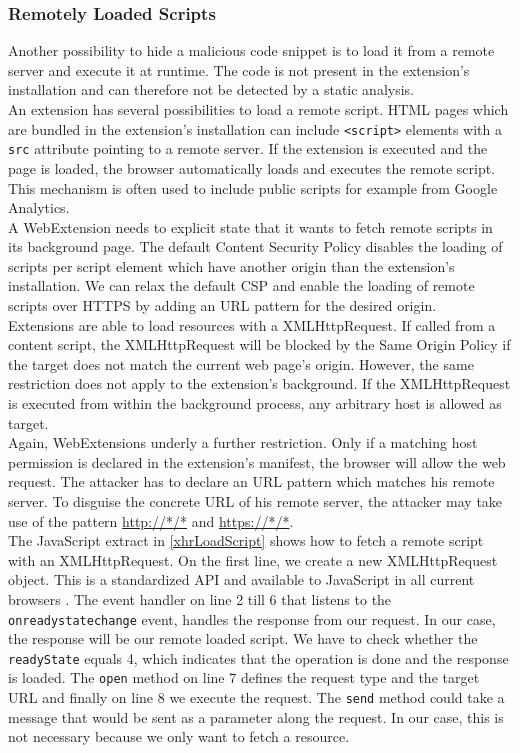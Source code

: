 		\subsubsection{Remotely Loaded Scripts}
			
			Another possibility to hide a malicious code snippet is to load it from a remote server and execute it at runtime. The code is not present in the extension's installation and can therefore not be detected by a static analysis. \\
		
			An extension has several possibilities to load a remote script. HTML pages which are bundled in the extension's installation can include \texttt{<script>} elements with a \texttt{src} attribute pointing to a remote server. If the extension is executed and the page is loaded, the browser automatically loads and executes the remote script. This mechanism is often used to include public scripts for example from Google Analytics. \\
			A WebExtension needs to explicit state that it wants to fetch remote scripts in its background page. The default Content Security Policy disables the loading of scripts per script element which have another origin than the extension's installation. We can relax the default CSP and enable the loading of remote scripts over HTTPS by adding an URL pattern for the desired origin. \\

			Extensions are able to load resources with a XMLHttpRequest. If called from a content script, the XMLHttpRequest will be blocked by the Same Origin Policy if the target does not match the current web page's origin. However, the same restriction does not apply to the extension's background. If the XMLHttpRequest is executed from within the background process, any arbitrary host is allowed as target. \\
			Again, WebExtensions underly a further restriction. Only if a matching host permission is declared in the extension's manifest, the browser will allow the web request. The attacker has to declare an URL pattern which matches his remote server. To disguise the concrete URL of his remote server, the attacker may take use of the pattern \url{http://*/*} and \url{https://*/*}. \\
			The JavaScript extract in \autoref{xhrLoadScript} shows how to fetch a remote script with an XMLHttpRequest. On the first line, we create a new XMLHttpRequest object. This is a standardized API and available to JavaScript in all current browsers \cite{w3cXMLHttpRequest}. The event handler on line 2 till 6 that listens to the \texttt{onreadystatechange} event, handles the response from our request. In our case, the response will be our remote loaded script. We have to check whether the \texttt{readyState} equals 4, which indicates that the operation is done and the response is loaded. The \texttt{open} method on line 7 defines the request type and the target URL and finally on line 8 we execute the request. The \texttt{send} method could take a message that would be sent as a parameter along the request. In our case, this is not necessary because we only want to fetch a resource. 
			
